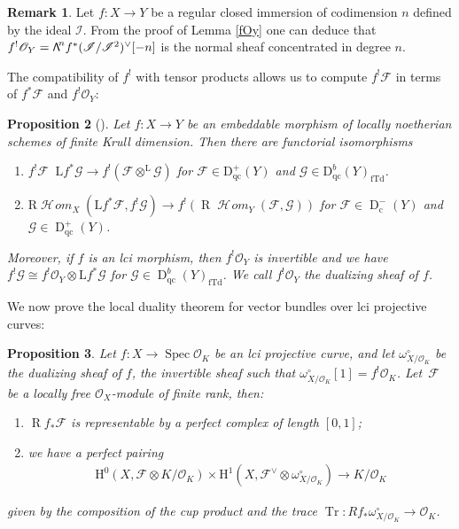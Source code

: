 \documentclass[JEP,XML,SOM,Unicode,published]{cedram}
\newcommand\bw[1]{\mathbin{\hbox{$\mathsf{\Lambda}$}^{\!#1}}}
\newcommand{\rc}{\mathrm{c}}
\newcommand{\qc}{\mathrm{qc}}
\newcommand{\fTd}{\mathrm{fTd}}
\numberwithin{equation}{section}
\newtheorem{prop}{Proposition}[section]
\theoremstyle{definition}
\newtheorem{remark}[prop]{Remark}
\newcommand{\n}[1]{\mathcal{#1}}
\newcommand{\s}[1]{\mathscr{#1}}
\DeclareMathOperator{\Tr}{Tr}
\DeclareMathOperator{\R}{R}
\DeclareMathOperator{\D}{D}
\DeclareMathOperator{\dotimes}{\otimes^{\mathrm{L}}}
\DeclareMathOperator{\Spec}{Spec}
\DeclareMathOperator{\sHom}{\s{H}\!\mathit{om}}
\begin{document}
\begin{remark}
Let $f:X\to Y$ be a regular closed immersion of codimension $n$ defined by the ideal $\s{I}$. From the proof of Lemma \ref{fOy} one can deduce that $f^!\s{O}_Y=\bw{n} f^*(\s{I}/\s{I}^2)^{\vee}[-n]$ is the normal sheaf concentrated in degree $n$.
\end{remark}

The compatibility of $f^!$ with tensor products allows us to compute $f^!\s{F}$ in terms of $f^*\n{F}$ and $f^!\s{O}_Y$:

\begin{prop}[{\cite[Prop.\,III.8.8]{hartshorne1966residues}}]
\label{dualizingAndTensor}
Let $f:X\to Y$ be an embeddable morphism of locally noetherian schemes of finite Krull dimension. Then there are functorial isomorphisms
\begin{enumerate}

\item $f^!\n{F}\dotimes \mathrm{L}f^*\n{G}\to f^!(\n{F}\otimes^{\mathrm{L}} \n{G})$ for $\n{F}\in \mathrm{D}_{\qc}^+(Y)$ and $\n{G}\in \mathrm{D}^b_{\qc}(Y)_{\fTd}$.

\item $\mathrm{R} \sHom_X(\mathrm{L}f^*\n{F}, f^! \n{G})\!\to\!f^!(\R \sHom_{Y}(\n{F}, \n{G}))$ for $\n{F}\!\in\!\D^-_{\rc}(Y)$ and $\n{G}\!\in\!\D^+_{\qc}(Y)$.
\end{enumerate}

Moreover, if $f$ is an lci morphism, then $f^!\s{O}_Y$ is invertible and we have $f^!\n{G}\cong f^!\s{O}_Y\otimes \mathrm{L}f^* \n{G}$ for $\n{G}\in \D^{b}_{\qc}(Y)_{\fTd}$. We call $f^! \s{O}_Y$ the dualizing sheaf of $f$.
\end{prop}

We now prove the local duality theorem for vector bundles over lci projective curves:

\begin{prop}
\label{LocalDualityCurves}
Let $f: X\to \Spec \n{O}_K$ be an lci projective curve, and let $\omega_{X/\n{O}_K}^\circ$ be the dualizing sheaf of $f$, \ie the invertible sheaf such that $\omega_{X/\n{O}_K}^\circ[1]=f^!\n{O}_K$. Let~$\n{F}$ be a locally free $\s{O}_X$-module of finite rank, then:
\begin{enumerate}

\item $\R f_*\n{F}$ is representable by a perfect complex of length $[0,1]$;

\item we have a perfect pairing
\begin{align*}
\mathrm{H}^0(X,\n{F}\otimes K/\n{O}_K)\times \mathrm{H}^1(X, \n{F}^\vee\otimes \omega_{X/\n{O}_K}^\circ)\to K/\n{O}_K
\end{align*}
\end{enumerate}
given by the composition of the cup product and the trace $\Tr: Rf_* \omega^{\circ}_{X/\n{O}_K}\to \n{O}_K$.
\end{prop}
\end{document}
